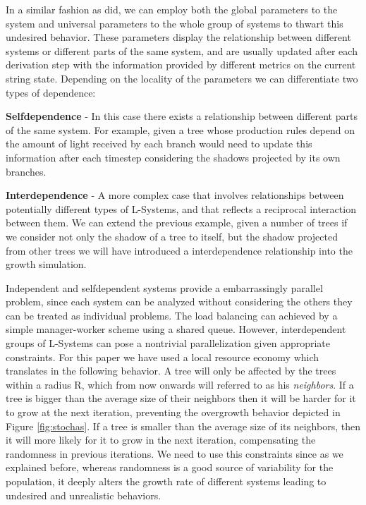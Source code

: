 \documentclass[letterpaper,twoside,11pt]{article}
\begin{document}
\begin{multicols}{2}
In a similar fashion as \cite{KurthSloboda2002} did, we can employ  both the global parameters to the system and universal parameters to the whole group of systems to thwart this undesired behavior. These parameters display the relationship between different systems or different parts of the same system, and are usually updated after each derivation step with the information provided by different metrics on the current string state.  Depending on the locality of the parameters we can differentiate two types of dependence:
\begin{compactenum}[a)]
\item \textbf{Selfdependence} - In this case there exists a relationship between different parts of the same system. For example, given a tree whose production rules depend on the amount of light received by each branch would need to update this information after each timestep considering the shadows projected by its own branches.
\item \textbf{Interdependence} - A more complex case that involves relationships between potentially different types of L-Systems, and that reflects a reciprocal interaction between them. We can extend the previous example, given a number of trees if we consider not only the shadow of a tree to itself, but the shadow projected from other trees we will have introduced a interdependence relationship into the growth simulation.
\end{compactenum}

 Independent and selfdependent systems provide a embarrassingly parallel problem, since each system can be analyzed without considering the others they can be treated as individual problems. The load balancing can achieved by a simple manager-worker scheme using a shared queue. However, interdependent groups of L-Systems can pose a nontrivial parallelization given appropriate constraints. For this paper we have used a local resource economy which translates in the following behavior. A tree will only be affected by the trees within a radius R, which from now onwards will referred to as his \emph{neighbors}. If a tree is bigger than the average size of their neighbors then it will be harder for it to grow at the next iteration, preventing the overgrowth behavior depicted in Figure \ref{fig:stochas}. If a tree is smaller than the average size of its neighbors, then it will more likely for it to grow in the next iteration, compensating the randomness in previous iterations. We need to use this constraints since as we explained before, whereas randomness is a good source of variability for the population, it deeply alters the growth rate of different systems leading to undesired and unrealistic behaviors.


\end{multicols}
\end{document}
